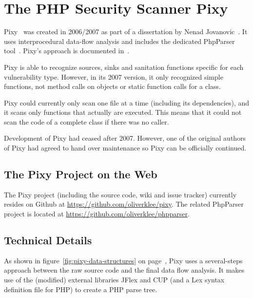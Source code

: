 \chapter{The PHP Security Scanner Pixy}
\label{pixy}
Pixy~\cite{pixy} was created in 2006/2007 as part of a dissertation by Nenad Jovanovic~\cite{pixy-dissertation}. It uses interprocedural data-flow analysis and includes the dedicated PhpParser tool~\cite{phpparser}. Pixy's approach is documented in~\cite{pixy-short, pixy-long, pixy-technical, pixy-dissertation}.

Pixy is able to recognize sources, sinks and sanitation functions specific for each vulnerability type. However, in its 2007 version, it only recognized simple functions, not method calls on objects or static function calls for a class.

Pixy could currently only scan one file at a time (including its dependencies), and it scans only functions that actually are executed. This means that it could not scan the code of a complete class if there was no caller.

Development of Pixy had ceased after 2007. However, one of the original authors of Pixy had agreed to hand over maintenance so Pixy can be officially continued.

\section{The Pixy Project on the Web}

The Pixy project (including the source code, wiki and issue tracker) currently resides on Github at \url{https://github.com/oliverklee/pixy}. The related PhpParser project is located at \url{https://github.com/oliverklee/phpparser}.

\section{Technical Details}

As shown in figure~\ref{fig:pixy-data-structures} on page~\pageref{fig:pixy-data-structures}, Pixy uses a several-steps approach between the raw source code and the final data flow analysis. It makes use of the (modified) external libraries JFlex and CUP (and a Lex syntax definition file for PHP) to create a PHP parse tree.

